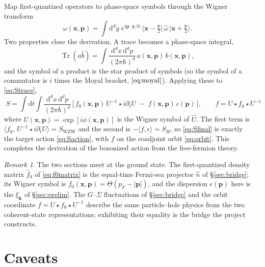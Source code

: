 \documentclass[11pt]{article}
\theoremstyle{remark}
\newtheorem*{remark}{Remark}
\begin{document}
Map first-quantized operators to phase-space symbols through the Wigner transform
\begin{equation}
\label{eq:wigner}
\omega(\bm{x},\bm{p}) = \int \mathrm{d}^dy\; e^{i\bm{p}\cdot\bm y/\hbar}\,
\big\langle \bm{x}-\tfrac{\bm y}{2}\big|\,\hat\omega\,\big|\bm{x}+\tfrac{\bm y}{2}\big\rangle .
\end{equation}
Two properties close the derivation. A trace becomes a phase-space integral,
\begin{equation}
\label{eq:trwigner}
\operatorname{Tr}(\hat a\hat b) = \int \frac{\mathrm{d}^dx\,\mathrm{d}^dp}{(2\pi\hbar)^d}\, a(\bm{x},\bm{p})\,b(\bm{x},\bm{p}),
\end{equation}
and the symbol of a product is the star product of symbols (so the symbol of a
commutator is $i$ times the Moyal bracket, $\eqref{eq:moyal}$). Applying these to
\eqref{eq:Strace},
\begin{equation}
\label{eq:Sfinal}
\boxed{\;
S = \int \mathrm{d} t\int \frac{\mathrm{d}^dx\,\mathrm{d}^dp}{(2\pi\hbar)^d}\,
\Big[\, f_0(\bm{x},\bm{p})\,U^{-1}\!\star i\partial_t U \;-\; f(\bm{x},\bm{p})\,\epsilon(\bm{p})\,\Big],
\qquad f = U\star f_0\star U^{-1}\; }
\end{equation}
where $U(\bm{x},\bm{p})=\exp[i\phi(\bm{x},\bm{p})]$ is the Wigner symbol of $\hat U$. The first
term is $\langle f_0,\,U^{-1}\!\star i\partial_t U\rangle = S_{\mathrm{WZW}}$ and the
second is $-\langle f,\epsilon\rangle = S_H$, so \eqref{eq:Sfinal} is exactly the
target action \eqref{eq:Saction}, with $f$ on the coadjoint orbit \eqref{eq:orbit}.
This completes the derivation of the bosonized action from the free-fermion theory.

\begin{remark}
The two sections meet at the ground state. The first-quantized density matrix
$\hat f_0$ of \eqref{eq:f0matrix} is the equal-time Fermi-sea projector $\hat n$ of
\S\ref{sec:bridge}; its Wigner symbol is $f_0(\bm{x},\bm{p})=\Theta(p_F-|\bm{p}|)$, and the
dispersion $\epsilon(\bm{p})$ here is the $\xi_{\bm{k}}$ of \S\ref{sec:prelim}. The
$G$--$\Sigma$ fluctuations of \S\ref{sec:bridge} and the orbit coordinate
$f=U\star f_0\star U^{-1}$ describe the same particle--hole physics from the two
coherent-state representations; exhibiting their equality is the bridge the
project constructs.
\end{remark}

\section*{Caveats}
\end{document}

